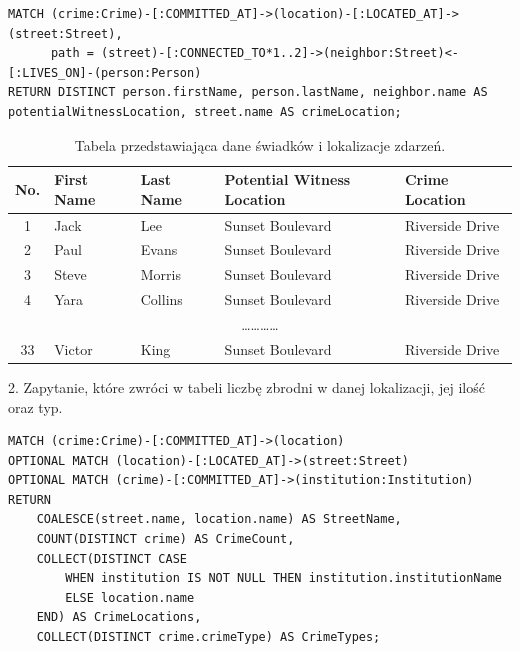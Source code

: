 \documentclass[a4paper,12pt]{article}
\begin{document}
\begin{center}
\begin{minipage}{0.8\linewidth}
\begin{lstlisting}[language=Cypher, basicstyle=\small, breaklines=true]
MATCH (crime:Crime)-[:COMMITTED_AT]->(location)-[:LOCATED_AT]->(street:Street),
      path = (street)-[:CONNECTED_TO*1..2]->(neighbor:Street)<-[:LIVES_ON]-(person:Person)
RETURN DISTINCT person.firstName, person.lastName, neighbor.name AS potentialWitnessLocation, street.name AS crimeLocation;
\end{lstlisting}
\end{minipage}
\end{center}

\begin{table}[h!]
\centering
\begin{tabular}{|c|l|l|l|l|}
\hline
\textbf{No.} & \textbf{First Name} & \textbf{Last Name} & \textbf{Potential Witness Location} & \textbf{Crime Location} \\ \hline
1            & Jack                & Lee                & Sunset Boulevard                   & Riverside Drive          \\ \hline
2            & Paul                & Evans              & Sunset Boulevard                   & Riverside Drive          \\ \hline
3            & Steve               & Morris             & Sunset Boulevard                   & Riverside Drive          \\ \hline
4            & Yara                & Collins            & Sunset Boulevard                   & Riverside Drive          \\ \hline
\multicolumn{5}{|c|}{\dots\dots\dots\dots} \\ \hline
33           & Victor              & King               & Sunset Boulevard                   & Riverside Drive          \\ \hline
\end{tabular}
\caption{Tabela przedstawiająca dane świadków i lokalizacje zdarzeń.}
\label{tab:witness_data}
\end{table}

2. Zapytanie, które zwróci w tabeli liczbę zbrodni w danej lokalizacji, jej ilość oraz typ.

\begin{center}
\begin{minipage}{0.8\linewidth}
\begin{lstlisting}[language=Cypher, basicstyle=\small, breaklines=true]
MATCH (crime:Crime)-[:COMMITTED_AT]->(location)
OPTIONAL MATCH (location)-[:LOCATED_AT]->(street:Street)
OPTIONAL MATCH (crime)-[:COMMITTED_AT]->(institution:Institution)
RETURN 
    COALESCE(street.name, location.name) AS StreetName, 
    COUNT(DISTINCT crime) AS CrimeCount, 
    COLLECT(DISTINCT CASE 
        WHEN institution IS NOT NULL THEN institution.institutionName 
        ELSE location.name 
    END) AS CrimeLocations,
    COLLECT(DISTINCT crime.crimeType) AS CrimeTypes;
\end{lstlisting}
\end{minipage}
\end{center}
\end{document}
